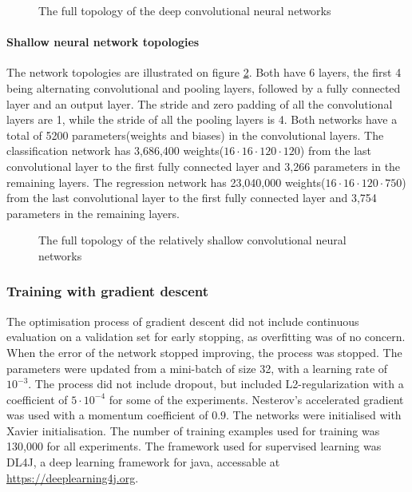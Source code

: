 \begin{figure}[H]
	\vspace{-8mm}
	\begin{center}
	\begin{scriptsize}
		\sffamily
		\def\svgwidth{0.95\textwidth}
		
	\end{scriptsize}
	\end{center}
	\caption{The full topology of the deep convolutional neural networks}
	\label{fig:architectureOfDeepNet}
\end{figure}

\paragraph{Shallow neural network topologies}
The network topologies are illustrated on figure \ref{fig:architectureOfShallowNet}. Both have 6 layers, the first 4 being alternating convolutional and pooling layers, followed by a fully connected layer and an output layer.  The stride and zero padding of all the convolutional layers are 1, while the stride of all the pooling layers is 4. Both networks have a total of 5200 parameters(weights and biases) in the convolutional layers.
The classification network has 3,686,400 weights($16 \cdot 16 \cdot 120 \cdot 120$) from the last convolutional layer to the first fully connected layer and 3,266 parameters in the remaining layers.
The regression network has 23,040,000 weights($16 \cdot 16 \cdot 120 \cdot 750$) from the last convolutional layer to the first fully connected layer and 3,754 parameters in the remaining layers.

\begin{figure}[H]
	\begin{scriptsize}
		\sffamily
		\def\svgwidth{\textwidth}
		
	\end{scriptsize}
	\caption{The full topology of the relatively shallow convolutional neural networks}
	\label{fig:architectureOfShallowNet}
\end{figure}

\subsubsection{Training with gradient descent}
The optimisation process of gradient descent did not include continuous evaluation on a validation set for early stopping, as overfitting was of no concern. When the error of the network stopped improving, the process was stopped. The parameters were updated from a mini-batch of size 32, with a learning rate of $10^{-3}$. The process did not include dropout, but included L2-regularization with a coefficient of $5 \cdot 10^{-4}$ for some of the experiments. Nesterov's accelerated gradient was used with a momentum coefficient of $0.9$. The networks were initialised with Xavier initialisation. The number of training examples used for training was 130,000 for all experiments. The framework used for supervised learning was DL4J, a deep learning framework for java, accessable at \url{https://deeplearning4j.org}.

